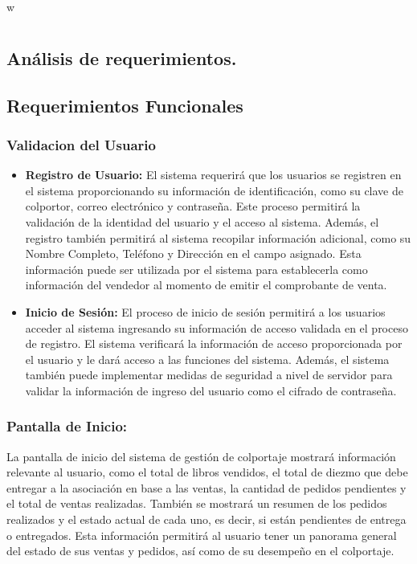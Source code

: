 \documentclass[runningheads]{llncs}
\begin{document}
w
    \section{}
    \section{}
    \section{}
        \subsection{Análisis de requerimientos.}

            \subsection*{Requerimientos Funcionales}
                \subsubsection{Validacion del Usuario}
                    \begin{itemize}
                        \item \textbf{Registro de Usuario: }El sistema requerirá que los usuarios se registren en el sistema proporcionando su información de identificación, como su clave de colportor, correo electrónico y contraseña. Este proceso permitirá la validación de la identidad del usuario y el acceso al sistema. Además, el registro también permitirá al sistema recopilar información adicional, como su Nombre Completo, Teléfono y Dirección en el campo asignado. Esta información puede ser utilizada por el sistema para establecerla como información del vendedor al momento de emitir el comprobante de venta.
                        \item \textbf{Inicio de Sesión: }El proceso de inicio de sesión permitirá a los usuarios acceder al sistema ingresando su información de acceso validada en el proceso de registro. El sistema verificará la información de acceso proporcionada por el usuario y le dará acceso a las funciones del sistema. Además, el sistema también puede implementar medidas de seguridad a nivel de servidor para validar la información de ingreso del usuario como el cifrado de contraseña.
                    \end{itemize}  
                \subsubsection{Pantalla de Inicio: }
                    La pantalla de inicio del sistema de gestión de colportaje mostrará información relevante al usuario, como el total de libros vendidos, el total de diezmo que debe entregar a la asociación en base a las ventas, la cantidad de pedidos pendientes y el total de ventas realizadas. También se mostrará un resumen de los pedidos realizados y el estado actual de cada uno, es decir, si están pendientes de entrega o entregados. Esta información permitirá al usuario tener un panorama general del estado de sus ventas y pedidos, así como de su desempeño en el colportaje.
\end{document}
